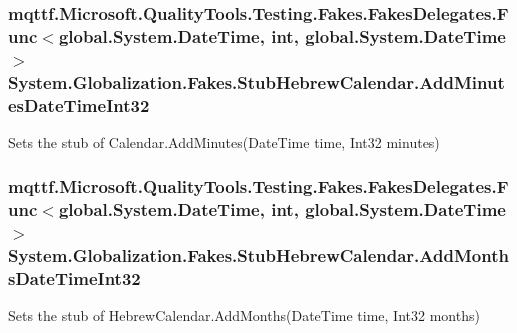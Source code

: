 \hypertarget{class_system_1_1_globalization_1_1_fakes_1_1_stub_hebrew_calendar_a6979d049e1b12e35e02b785900621d1e}{
\subsubsection[{Add\-Minutes\-Date\-Time\-Int32}]{\setlength{\rightskip}{0pt plus 5cm}mqttf.\-Microsoft.\-Quality\-Tools.\-Testing.\-Fakes.\-Fakes\-Delegates.\-Func$<$global.\-System.\-Date\-Time, int, global.\-System.\-Date\-Time$>$ System.\-Globalization.\-Fakes.\-Stub\-Hebrew\-Calendar.\-Add\-Minutes\-Date\-Time\-Int32}}\label{class_system_1_1_globalization_1_1_fakes_1_1_stub_hebrew_calendar_a6979d049e1b12e35e02b785900621d1e}


Sets the stub of Calendar.\-Add\-Minutes(\-Date\-Time time, Int32 minutes)

\hypertarget{class_system_1_1_globalization_1_1_fakes_1_1_stub_hebrew_calendar_aeb5f4affab776b2b52b211dccf48b699}{
\subsubsection[{Add\-Months\-Date\-Time\-Int32}]{\setlength{\rightskip}{0pt plus 5cm}mqttf.\-Microsoft.\-Quality\-Tools.\-Testing.\-Fakes.\-Fakes\-Delegates.\-Func$<$global.\-System.\-Date\-Time, int, global.\-System.\-Date\-Time$>$ System.\-Globalization.\-Fakes.\-Stub\-Hebrew\-Calendar.\-Add\-Months\-Date\-Time\-Int32}}\label{class_system_1_1_globalization_1_1_fakes_1_1_stub_hebrew_calendar_aeb5f4affab776b2b52b211dccf48b699}


Sets the stub of Hebrew\-Calendar.\-Add\-Months(\-Date\-Time time, Int32 months)

